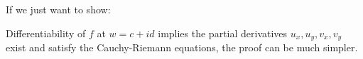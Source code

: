 \begin{remark}
    If we just want to show:

    Differentiability of \(f\) at \(w = c + id\) implies the partial derivatives \(u_x, u_y, v_x, v_y\) exist and satisfy the Cauchy-Riemann equations, the proof can be much simpler.
\end{remark}